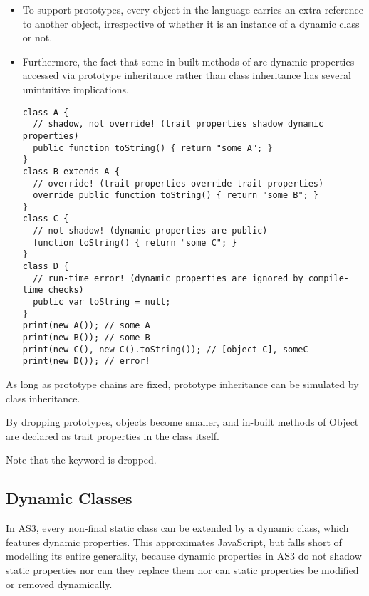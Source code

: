 \begin{itemize}
\item To support prototypes, every object in the language carries an
extra reference to another object, irrespective of whether it is an
instance of a dynamic class or not.

\item Furthermore, the fact that some in-built methods of  are
dynamic properties accessed via prototype inheritance rather than class inheritance
has several unintuitive implications.

\begin{verbatim}
class A {
  // shadow, not override! (trait properties shadow dynamic properties)
  public function toString() { return "some A"; }
}
class B extends A {
  // override! (trait properties override trait properties)
  override public function toString() { return "some B"; }
}
class C {
  // not shadow! (dynamic properties are public)
  function toString() { return "some C"; }
}
class D {
  // run-time error! (dynamic properties are ignored by compile-time checks)
  public var toString = null;
}
print(new A()); // some A
print(new B()); // some B
print(new C(), new C().toString()); // [object C], someC
print(new D()); // error!
\end{verbatim}

\end{itemize}

As long as prototype chains are fixed, prototype inheritance can be
simulated by class inheritance.

By dropping prototypes, objects become smaller, and in-built methods of
Object are declared as trait properties in the class itself.

Note that the keyword  is dropped.


\subsection{Dynamic Classes}
\label{dynamicClasses}
In AS3, every non-final static class can be extended by a dynamic class, which
features dynamic properties. This approximates JavaScript, but falls short of
modelling its entire generality, because dynamic properties in AS3 do not shadow
static properties nor can they replace them nor can static properties be
modified or removed dynamically.


